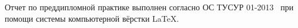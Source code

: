 
Отчет по преддипломной практике выполнен согласно ОС ТУСУР 01-2013~\cite{ostusur} при помощи системы компьютерной вёрстки \LaTeX. 
